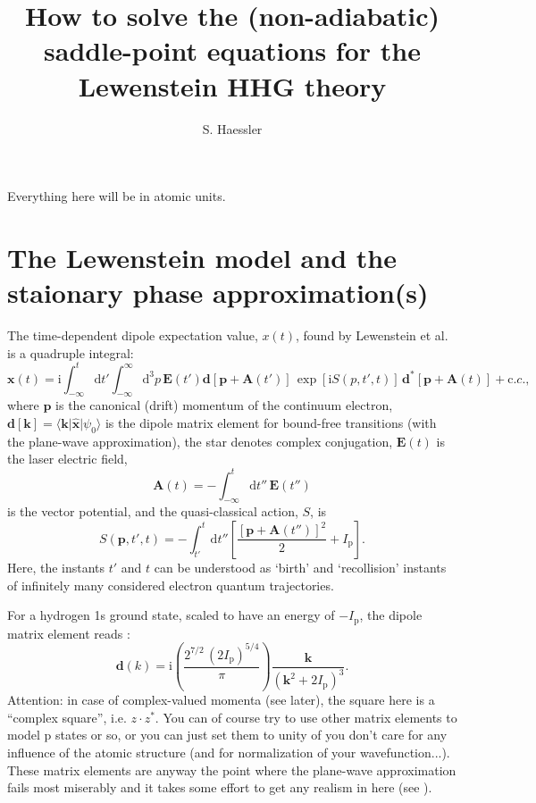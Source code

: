\documentclass[10pt]{article}
\title{How to solve the (non-adiabatic) saddle-point equations for the Lewenstein HHG theory}
\author{S. Haessler}
\newcommand{\rmi}{\mathrm i}
\newcommand{\rmd}{\mathrm d}
\newcommand{\Ip}{I_{\mathrm p}}
\newcommand{\cc}{\mathrm c.c.}
\begin{document}
\maketitle

Everything here will be in atomic units. 

\section{The Lewenstein model and the staionary phase approximation(s)}

The time-dependent dipole expectation value, $x(t)$, found by Lewenstein et al.   \cite{Lewenstein1994Theory} is a quadruple integral:
\begin{equation}
	\mathbf{x}(t)	=  \rmi \int_{-\infty}^t \rmd t' \int_{-\infty}^\infty \rmd^3 p \,\mathbf{E}(t') \mathbf{d}[\mathbf{p}+\mathbf{A}(t')] \,\exp[\rmi S(p,t',t)] \,\mathbf{d}^* [\mathbf{p}+\mathbf{A}(t)] + \cc,  \label{eq:lewint}
\end{equation}
where $\mathbf{p}$ is the canonical (drift) momentum of the continuum electron, $\mathbf{d}[\mathbf{k}]=\langle \mathbf{k}\vert \hat{\mathbf{x}}\vert\psi_0\rangle$ is the dipole matrix element for bound-free transitions (with the plane-wave approximation), the star denotes complex conjugation, $\mathbf{E}(t)$ is the laser electric field,
\begin{equation}
	\mathbf{A}(t)=-\int_{-\infty}^t \rmd t''\, \mathbf{E}(t'')
\end{equation}
is the vector potential, and the quasi-classical action, $S$, is 
\begin{equation}
	S(\mathbf{p},t',t)	=  -\int_{t'}^t \rmd t'' \left[ \frac{ [\mathbf{p}+\mathbf{A}(t'')]^2}{2} + \Ip \right].  \label{eq:action}
\end{equation}
Here, the instants $t'$ and $t$ can be understood as `birth' and `recollision' instants of infinitely many considered electron quantum trajectories.
 
For a hydrogen 1s ground state, scaled to have an energy of $-\Ip$, the dipole matrix element reads  \cite{Lewenstein1994Theory}:
\begin{equation}
	\mathbf{d}(k)	=  \rmi \left( \frac{2^{7/2}\,  (2\Ip)^{5/4}}{\pi} \right)  \frac{\mathbf{k}}{(\mathbf{k}^2+2\Ip)^3}.
\end{equation}
Attention: in case of complex-valued momenta (see later), the square here is a ``complex square'', i.e. $z\cdot z^*$. You can of course try to use other matrix elements to model p states or so, or you can just set them to unity of you don't care for any influence of the atomic structure (and for normalization of your wavefunction...). These matrix elements are anyway the point where the plane-wave approximation fails most miserably and it takes some effort to get any realism in here (see \cite{Le2009QRS}).
\end{document}
